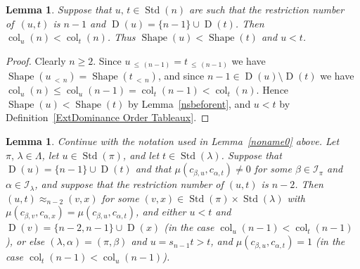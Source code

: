 \documentclass[10pt]{amsart}
\newtheorem{lemm}[theo]{Lemma}
\theoremstyle{definition}
\DeclareMathOperator{\col}{col}
\newcommand{\lessthan}[2]{#1\,{_{<\,#2}}}
\newcommand{\Lessthan}[2]{#1\,{_{\leqslant\,#2}}}
\DeclareMathOperator{\STD}{Std}
\DeclareMathOperator{\shape}{Shape}
\DeclareMathOperator{\D}{D}
\begin{document}
\begin{lemm}\label{nminus1order0}
Suppose that $u,\,t\in\STD(n)$ are such that the restriction number of~$(u,t)$
is $n-1$ and $\D(u) = \{n-1\} \cup \D(t)$. Then
$\col_u(n)<\col_t(n)$. Thus $\shape(u)<\shape(t)$ and $u<t$.
\end{lemm}

\begin{proof}
Clearly $n\geqslant 2$. Since $\Lessthan u{(n-1)}=\Lessthan t{(n-1)}$
we have $\shape(\lessthan un)=\shape(\lessthan tn)$, and
since $n-1\in\D(u)\setminus\D(t)$ we have
$\col_u(n)\leqslant\col_u(n-1)=\col_t(n-1)<\col_t(n)$.
Hence $\shape(u)<\shape(t)$ by Lemma~\ref{nsbeforent}, and $u<t$
by Definition~\ref{ExtDominance Order Tableaux}.
\end{proof}

\begin{lemm}\label{nminus1order}
Continue with the notation used in Lemma~\ref{noname0} above. Let
$\pi,\,\lambda\in\Lambda$, let $u\in\STD(\pi)$, and let $t\in\STD(\lambda)$.
Suppose that $\D(u) = \{n-1\} \cup \D(t)$ and that $\mu(c_{\beta,u},c_{\alpha,t}) \neq 0$
for some $\beta\in\mathcal{I}_{\pi}$ and $\alpha\in\mathcal{I}_{\lambda}$,
and suppose that the restriction number of $(u,t)$ is $n-2$.
Then $(u,t)\approx_{n-2} (v,x)$ for some
$(v,x)\in\STD(\pi)\times\STD(\lambda)$ with
$\mu(c_{\beta,v},c_{\alpha,x})=\mu(c_{\beta,u},c_{\alpha,t})$, and
either $u<t$ and $\D(v) = \{n-2,n-1\} \cup \D(x)$
(in the case $\col_u(n-1)<\col_t(n-1)$), or else $(\lambda,\alpha)=(\pi,\beta)$
and $u=s_{n-1}t>t$, and $\mu(c_{\beta,u},c_{\alpha,t}) = 1$ (in the
case $\col_t(n-1)<\col_u(n-1)$).
\end{lemm}
\end{document}
